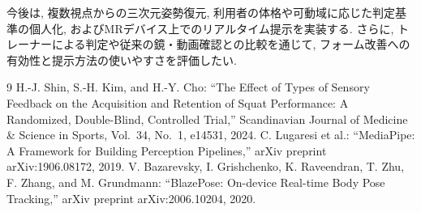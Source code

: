 \documentclass[a4paper,9pt,twocolumn]{jsarticle}
\begin{document}
今後は, 複数視点からの三次元姿勢復元, 利用者の体格や可動域に応じた判定基準の個人化, およびMRデバイス上でのリアルタイム提示を実装する. 
さらに, トレーナーによる判定や従来の鏡・動画確認との比較を通じて, フォーム改善への有効性と提示方法の使いやすさを評価したい. 

\vspace{\baselineskip}

\begin{thebibliography}{9}
\fontsize{9pt}{11pt}\selectfont
{}
H.-J. Shin, S.-H. Kim, and H.-Y. Cho:
``The Effect of Types of Sensory Feedback on the Acquisition and Retention of Squat Performance:
A Randomized, Double-Blind, Controlled Trial,''
Scandinavian Journal of Medicine \& Science in Sports,
Vol.~34, No.~1, e14531, 2024.
C. Lugaresi et al.:
``MediaPipe: A Framework for Building Perception Pipelines,''
arXiv preprint arXiv:1906.08172, 2019.
V. Bazarevsky, I. Grishchenko, K. Raveendran, T. Zhu, F. Zhang, and M. Grundmann:
``BlazePose: On-device Real-time Body Pose Tracking,''
arXiv preprint arXiv:2006.10204, 2020.
\end{thebibliography}
\end{document}
